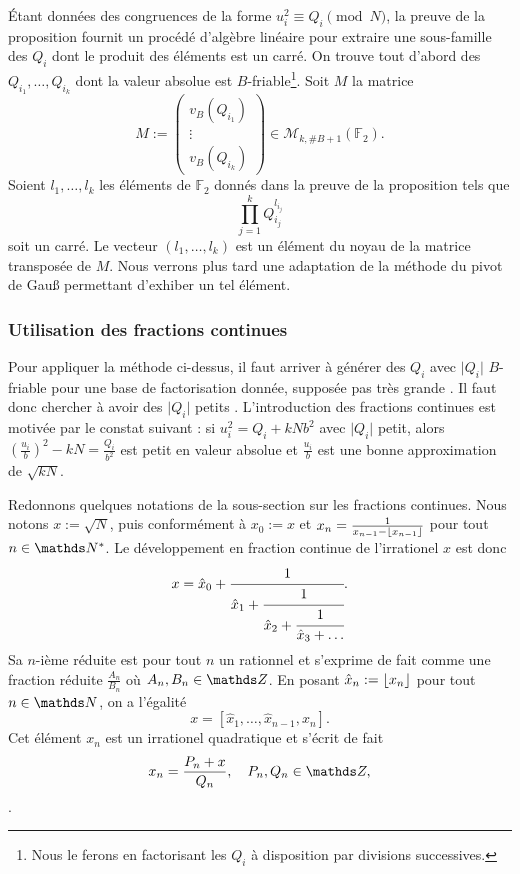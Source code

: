 Étant données des congruences de la forme $u_i^2 \equiv Q_i \pmod{N}$, la
preuve de la proposition fournit un procédé d'algèbre linéaire pour extraire
une sous-famille des $Q_i$ dont le produit des éléments est un carré. On trouve
tout d'abord des $Q_{i_1}, \dots, Q_{i_k}$ dont la valeur absolue est
$B$-friable\footnote{Nous le ferons en factorisant les $Q_i$ à disposition par
divisions successives.}. Soit $M$ la matrice \[M := \begin{pmatrix}
v_B(Q_{i_1}) \\ \vdots \\ v_B(Q_{i_k})\end{pmatrix}\in \mathcal{M}_{k,
\#B+1}(\mathbb{F}_2).\] Soient $l_{1}, \dots, l_{k}$ les éléments de
$\mathbb{F}_2$ donnés dans la preuve de la proposition tels que \[\prod_{j=1}^k
Q_{i_j}^{l_{i_j}}\] soit un carré. Le vecteur $(l_1, \dots, l_{k})$ est un
élément du noyau de la matrice transposée de $M$. Nous verrons plus tard une
adaptation de la méthode du pivot de Gau\ss{} permettant d'exhiber un tel
élément.

\subsubsection{Utilisation des fractions continues}

Pour appliquer la méthode ci-dessus, il faut arriver à générer des $Q_i$ 
avec $\lvert  Q_i \rvert$ $B$-friable pour une base de factorisation donnée,
supposée \og{} pas très grande \fg. Il faut donc chercher à avoir des
$\lvert Q_i \rvert$ \og{} petits \fg. L'introduction des fractions continues
est motivée par le constat suivant : si $u_i^2 = Q_i + kNb^2$ avec $\lvert 
Q_i \rvert$ petit, alors $\left(\frac{u_i}{b}\right)^2 - kN = \frac{Q_i}{b^2}$
est petit en valeur absolue et $\frac{u_i}{b}$ est une bonne approximation de 
$\sqrt{kN}$.


Redonnons quelques notations de la sous-section  sur les fractions
continues. Nous notons $x := \sqrt{N}$, puis conformément à  $x_0 :=
x$ et $x_n = \frac{1}{x_{n-1}- \lfloor x_{n-1}\rfloor}$ pour tout $n\in \N^*$. Le
développement en fraction continue de l'irrationel $x$ est donc \[x = \hat{x}_0
+ \cfrac{1}{\hat{x}_1 + \cfrac{1}{\hat{x}_2 + \cfrac{1}{\hat{x}_3 + \dots}}}.\]
Sa $n$-ième réduite est pour tout $n$ un rationnel et s'exprime de fait comme
une fraction réduite $\frac{A_n}{B_n}$ où $A_n, B_n\in \Z$.  En posant
$\hat{x}_n := \lfloor x_n\rfloor$ pour tout $n\in \N$, on a l'égalité  \[x =
[\hat{x}_1, \dots, \hat{x}_{n-1}, x_n].\] Cet élément $x_n$ est un irrationel
quadratique et s'écrit de fait  \[x_n = \frac{P_n + x}{Q_n},\quad P_n,
Q_n\in \Z,\]. 


